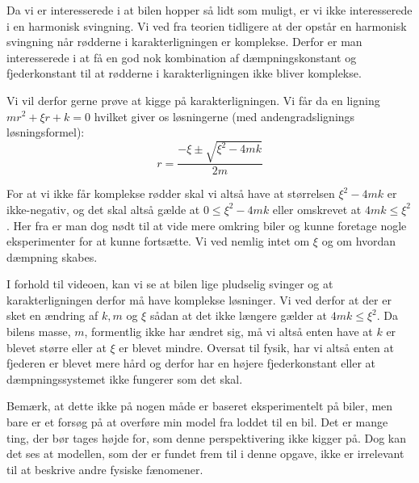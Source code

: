 Da vi er interesserede i at bilen hopper så lidt som muligt, er vi ikke interesserede i en harmonisk svingning. 
Vi ved fra teorien tidligere at der opstår en harmonisk svingning når rødderne i karakterligningen er komplekse. 
Derfor er man interesserede i at få en god nok kombination af dæmpningskonstant og fjederkonstant til at rødderne i karakterligningen ikke bliver komplekse. 

Vi vil derfor gerne prøve at kigge på karakterligningen. 
Vi får da en ligning $mr^2 + \xi r + k = 0$ hvilket giver os løsningerne (med andengradslignings løsningsformel):
$$r = \dfrac{-\xi \pm \sqrt{\xi ^2 - 4mk}}{2m}$$

For at vi ikke får komplekse rødder skal vi altså have at størrelsen $\xi ^2 -4mk$ er ikke-negativ, og det skal altså gælde at $0 \leq \xi ^2 -4mk $ eller omskrevet at $4mk \leq \xi ^2 $.
Her fra er man dog nødt til at vide mere omkring biler og kunne foretage nogle eksperimenter for at kunne fortsætte. 
Vi ved nemlig intet om $\xi$ og om hvordan dæmpning skabes. 

I forhold til videoen, kan vi se at bilen lige pludselig svinger og at karakterligningen derfor må have komplekse løsninger.
Vi ved derfor at der er sket en ændring af $k,m$ og $\xi$ sådan at det ikke længere gælder at $4mk \leq \xi ^2 $.
Da bilens masse, $m$, formentlig ikke har ændret sig, må vi altså enten have at $k$ er blevet større eller at $\xi$ er blevet mindre. 
Oversat til fysik, har vi altså enten at fjederen er blevet mere hård og derfor har en højere fjederkonstant eller at dæmpningssystemet ikke fungerer som det skal.

\vspace{0.75cm}

Bemærk, at dette ikke på nogen måde er baseret eksperimentelt    på biler, men bare er et forsøg på at overføre min model fra loddet til en bil. 
Det er mange ting, der bør tages højde for, som denne perspektivering ikke kigger på.
Dog kan det ses at modellen, som der er fundet frem til i denne opgave, ikke er irrelevant til at beskrive andre fysiske fænomener.

